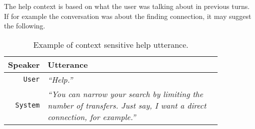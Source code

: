 The help context is based on what the user was talking about in previous turns.
If for example the conversation was about the finding connection, it may suggest the following.

\begin{table}[h]
\centering
\begin{tabular}{ | r | p{0.85\linewidth} | } \hline
	Speaker & Utterance \\ \hline
	\texttt{User} & \textit{``Help.''} \\ \hline
	\texttt{System} & \textit{``You can narrow your search by limiting the number of transfers.
	Just say, I want a direct connection, for example.''} \\ \hline
\end{tabular}
\caption[Context sensitive help]{Example of context sensitive help utterance.}
\label{table:confusion}
\end{table}






